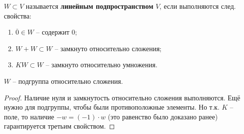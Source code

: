 \begin{conj}
    $W \subset V$ называется \textbf{линейным подпространством} $V$,
    если выполняются след. свойства:
    \begin{enumerate}
        \item $\overline{0} \in W$ -- содержит $0$;
        \item $W + W \subset W$ -- замкнуто относительно сложения;
        \item $KW \subset W$ -- замкнуто относительно умножения.
    \end{enumerate}
\end{conj}

\notice $W$ -- подгруппа относительно сложения.
\begin{proof}
    Наличие нуля и замкнутость относительно сложения выполняются.
    Ещё нужно для подгруппы, чтобы были противоположные элементы.
    Но т.к. $K$ -- поле, то наличие $-w = (-1) \cdot w$ (это равенство
    было доказано ранее) гарантируется третьим свойством.
\end{proof}

